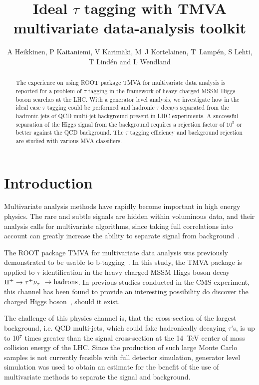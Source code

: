 \documentclass[a4paper]{jpconf}
\newcommand{\Hplustaunu}{\mbox{${\rm H}^{\pm} \to \tau^{\pm}\nu_{\tau}$}}
\begin{document}
\title{Ideal $\tau$ tagging with TMVA multivariate data-analysis toolkit}

\author{A Heikkinen, P Kaitaniemi, V Karim\"{a}ki,
M~J Kortelainen, T~Lamp\'{e}n, S Lehti, T Lind\'{e}n and L Wendland} 

\address{Helsinki Institute of Physics, P.O. Box 64, FIN-00014 University of Helsinki, Finland}



\begin{abstract}
The experience on using ROOT package TMVA for
multivariate data analysis is reported for a problem of $\tau$ tagging in the
framework of heavy charged MSSM Higgs boson searches at the LHC.
With a generator level analysis,
we investigate how in the ideal case $\tau$ tagging could be performed and
hadronic $\tau$ decays separated from the
hadronic jets of QCD multi-jet background present in LHC experiments.
A successful separation of the Higgs signal from the background
requires a rejection factor of $10^5$ or better against the QCD background.
The $\tau$ tagging efficiency and background rejection are studied with various MVA classifiers.
\end{abstract}


\section{Introduction}
Multivariate analysis methods have rapidly become important in high energy physics.
The rare and subtle signals are hidden within voluminous data, 
and their analysis calls for multivariate algorithms, since taking
full correlations into account can greatly increase the ability to separate signal
from background~\cite{statlearn}.


The ROOT package TMVA for multivariate data analysis was previously demonstrated
to be usable to b-tagging~\cite{chep07tmva}. In this study, the TMVA
package is applied to $\tau$ identification in the heavy charged MSSM Higgs
boson decay \Hplustaunu~$\to {\rm hadrons}$. In previous studies
conducted in the CMS experiment, this channel has been found to
provide an interesting possibility do discover the charged Higgs
boson~\cite{ptdrII}, should it exist.

The challenge of this physics channel is, that the cross-section of
the largest background, i.e. QCD multi-jets, which could fake
hadronically decaying $\tau$'s, is up to 10$^7$ times
greater than the signal cross-section at the 14~TeV center of mass
collision energy of the LHC. 
Since the production of such large Monte Carlo samples is not
currently feasible with full detector simulation, generator level
simulation was used to obtain an estimate for the
benefit of the use of multivariate methods to separate the signal and
background.
\end{document}
